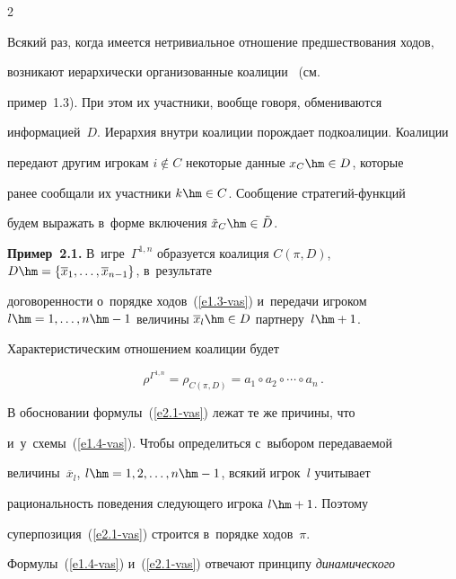 \begin{multicols}{2}
\vspace*{-4pt}

 

    Всякий раз, когда имеется нетривиальное отношение пред\-шест\-во\-ва\-ния ходов, 

возникают иерархически организованные коалиции~\cite{1-vas, 2-vas, 5-vas} (см.\ 

пример~1.3). При этом их участники, вообще говоря, обмениваются 

информацией~$D$. Иерархия внут\-ри коалиции по\-рож\-да\-ет подкоалиции. Коалиции 

передают другим игрокам $i\notin C$ некоторые данные $x_C\hm\in D$, которые 

ранее сообщали их участники $k\hm\in C$. Сообщение стра\-те\-гий-функ\-ций 

будем выражать в~форме включения $\tilde{x}_C\hm\in \tilde{D}$. 

    

    \textbf{Пример~2.1.} В~игре~$\Gamma^{1,n}$ образуется коалиция $C(\pi, 

D)$, $D\hm= \{\overline{x}_1, \ldots , \overline{x}_{n-1}\}$, в~результате 

до\-го\-во\-рен\-ности о~порядке ходов~(\ref{e1.3-vas}) и~передачи игроком $l\hm= 1, 

\ldots , n\hm-1$ величины $\overline{x}_l\hm\in D$ партнеру~$l\hm+1$. 

Характеристическим отношением коалиции будет 

     \begin{equation}

     \rho^{\Gamma^{1,n}}=\rho_{C(\pi,D)} =a_1\circ a_2\circ \cdots\circ a_n\,.

     \label{e2.1-vas}

     \end{equation}

    

    В обосновании формулы~(\ref{e2.1-vas}) лежат те же причины, что 

и~у~схемы~(\ref{e1.4-vas}). Чтобы определиться с~выбором пе\-ре\-да\-ва\-емой 

величины~$\overline{x}_l$, $l\hm= 1,2, \ldots ,n\hm-1$, всякий игрок~$l$ учитывает 

ра\-ци\-о\-наль\-ность поведения сле\-ду\-юще\-го игрока $l\hm+1$. Поэтому 

суперпозиция~(\ref{e2.1-vas}) строится в~порядке ходов~$\pi$. 

 Формулы~(\ref{e1.4-vas}) и~(\ref{e2.1-vas}) отвечают принципу \textit{динамического} 


\end{multicols}
